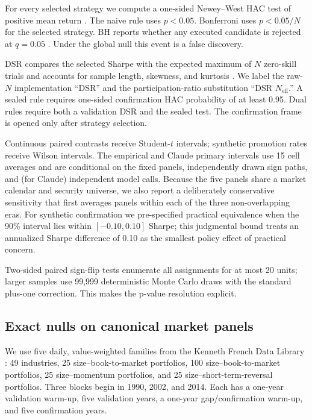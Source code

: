 \documentclass[sigconf,nonacm]{acmart}
\begin{document}
For every selected strategy we compute a one-sided Newey--West HAC test of
positive mean return \cite{newey1987hac}. The naive rule uses $p<0.05$.
Bonferroni uses $p<0.05/N$ for the selected strategy. BH reports whether any
executed candidate is rejected at $q=0.05$ \cite{benjamini1995fdr}. Under the
global null this event is a false discovery.

DSR compares the selected Sharpe with the expected maximum of $N$ zero-skill
trials and accounts for sample length, skewness, and kurtosis
\cite{bailey2014dsr}. We label the raw-$N$ implementation ``DSR'' and the
participation-ratio substitution ``DSR $N_{\mathrm{eff}}$.'' A sealed rule
requires one-sided confirmation HAC probability of at least 0.95. Dual rules
require both a validation DSR and the sealed test. The confirmation frame is
opened only after strategy selection.

Continuous paired contrasts receive Student-$t$ intervals; synthetic promotion
rates receive Wilson intervals. The empirical and Claude primary intervals use
15 cell averages and are conditional on the fixed panels, independently drawn
sign paths, and (for Claude) independent model calls. Because the five panels
share a market calendar and security universe, we also report a deliberately
conservative sensitivity that first averages panels within each of the three
non-overlapping eras. For synthetic confirmation we pre-specified practical
equivalence when the 90\% interval lies within $[-0.10,0.10]$ Sharpe; this
judgmental bound treats an annualized Sharpe difference of 0.10 as the smallest
policy effect of practical concern.

Two-sided paired sign-flip tests enumerate all assignments for at most 20 units;
larger samples use 99,999 deterministic Monte Carlo draws with the standard
plus-one correction. This makes the p-value resolution explicit.

\subsection{Exact nulls on canonical market panels}

We use five daily, value-weighted families from the Kenneth French Data Library
\cite{french2026data,fama1993common}: 49 industries, 25 size--book-to-market
portfolios, 100 size--book-to-market portfolios, 25 size--momentum portfolios,
and 25 size--short-term-reversal portfolios. Three blocks begin in 1990, 2002,
and 2014. Each has a one-year validation warm-up, five validation years, a
one-year gap/confirmation warm-up, and five confirmation years.
\end{document}
